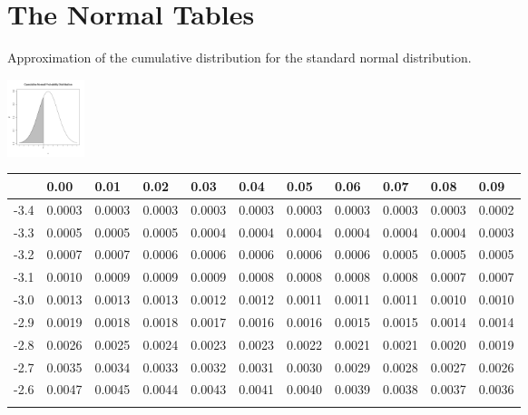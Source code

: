 
\section{The Normal Tables}

Approximation of the cumulative distribution for the standard normal
distribution. 

\hfill \includegraphics[height=2.25cm]{img/cummulativeDist}

\begin{tabular}{l|llllllllll}
     & 0.00   & 0.01   & 0.02   & 0.03   & 0.04   & 0.05   & 0.06   & 0.07   & 0.08  & 0.09 \\ \hline
-3.4 & 0.0003 & 0.0003 & 0.0003 & 0.0003 & 0.0003 & 0.0003 & 0.0003 & 0.0003 & 0.0003 & 0.0002 \\\arrayrulecolor{light-gray}\hline\arrayrulecolor{black} 
-3.3 & 0.0005 & 0.0005 & 0.0005 & 0.0004 & 0.0004 & 0.0004 & 0.0004 & 0.0004 & 0.0004 & 0.0003 \\\arrayrulecolor{light-gray}\hline\arrayrulecolor{black} 
-3.2 & 0.0007 & 0.0007 & 0.0006 & 0.0006 & 0.0006 & 0.0006 & 0.0006 & 0.0005 & 0.0005 & 0.0005 \\\arrayrulecolor{light-gray}\hline\arrayrulecolor{black} 
-3.1 & 0.0010 & 0.0009 & 0.0009 & 0.0009 & 0.0008 & 0.0008 & 0.0008 & 0.0008 & 0.0007 & 0.0007 \\\arrayrulecolor{light-gray}\hline\arrayrulecolor{black} 
-3.0 & 0.0013 & 0.0013 & 0.0013 & 0.0012 & 0.0012 & 0.0011 & 0.0011 & 0.0011 & 0.0010 & 0.0010 \\\arrayrulecolor{light-gray}\hline\arrayrulecolor{black} 
-2.9 & 0.0019 & 0.0018 & 0.0018 & 0.0017 & 0.0016 & 0.0016 & 0.0015 & 0.0015 & 0.0014 & 0.0014 \\\arrayrulecolor{light-gray}\hline\arrayrulecolor{black} 
-2.8 & 0.0026 & 0.0025 & 0.0024 & 0.0023 & 0.0023 & 0.0022 & 0.0021 & 0.0021 & 0.0020 & 0.0019 \\\arrayrulecolor{light-gray}\hline\arrayrulecolor{black} 
-2.7 & 0.0035 & 0.0034 & 0.0033 & 0.0032 & 0.0031 & 0.0030 & 0.0029 & 0.0028 & 0.0027 & 0.0026 \\\arrayrulecolor{light-gray}\hline\arrayrulecolor{black} 
-2.6 & 0.0047 & 0.0045 & 0.0044 & 0.0043 & 0.0041 & 0.0040 & 0.0039 & 0.0038 & 0.0037 & 0.0036 \\\arrayrulecolor{light-gray}\hline\arrayrulecolor{black} 

\end{tabular}
